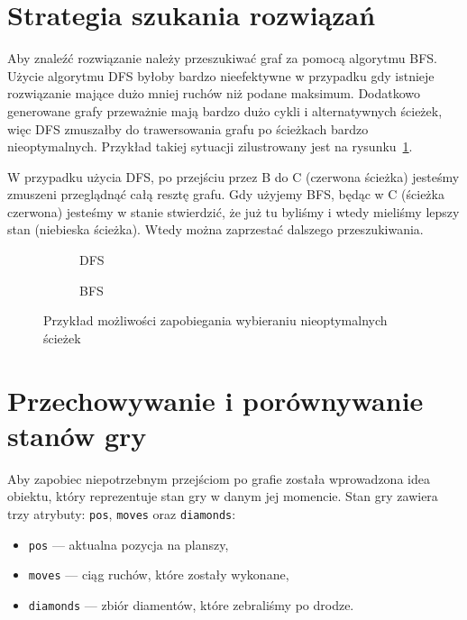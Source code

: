 \section{Strategia szukania rozwiązań}

Aby znaleźć rozwiązanie należy przeszukiwać graf za pomocą algorytmu BFS.
Użycie algorytmu DFS byłoby bardzo nieefektywne w przypadku gdy istnieje
rozwiązanie mające dużo mniej ruchów niż podane maksimum.
Dodatkowo generowane grafy przeważnie mają bardzo dużo cykli i alternatywnych
ścieżek, więc
DFS zmuszałby do trawersowania grafu po ścieżkach bardzo nieoptymalnych.
Przykład takiej sytuacji zilustrowany jest na rysunku~\ref{fig:dfs-vs-bfs}.

W przypadku użycia DFS, po przejściu przez B do C (czerwona ścieżka) jesteśmy
zmuszeni przeglądnąć całą resztę grafu.
Gdy użyjemy BFS, będąc w C (ścieżka czerwona) jesteśmy w stanie stwierdzić,
że już tu byliśmy i wtedy mieliśmy lepszy stan\footnotemark{} (niebieska ścieżka).
Wtedy można zaprzestać dalszego przeszukiwania.


\vspace{1cm}

\begin{figure}[!h]
    \centering
    \begin{subfigure}[b]{0.4\textwidth}
        \centering
        
        \caption{DFS}
    \end{subfigure}
    \begin{subfigure}[b]{0.4\textwidth}
        \centering
        
        \caption{BFS}
    \end{subfigure}
    \caption{Przykład możliwości zapobiegania wybieraniu nieoptymalnych ścieżek}
    \label{fig:dfs-vs-bfs}
\end{figure}

\section{Przechowywanie i porównywanie stanów gry}

Aby zapobiec niepotrzebnym przejściom po grafie została wprowadzona idea
obiektu, który reprezentuje stan gry w danym jej momencie.
Stan gry zawiera trzy atrybuty: \texttt{pos}, \texttt{moves} oraz
\texttt{diamonds}:
\begin{itemize}\itemsep0pt
    \item \texttt{pos} --- aktualna pozycja na planszy,
    \item \texttt{moves} --- ciąg ruchów, które zostały wykonane,
    \item \texttt{diamonds} --- zbiór diamentów, które zebraliśmy po drodze.
\end{itemize}

